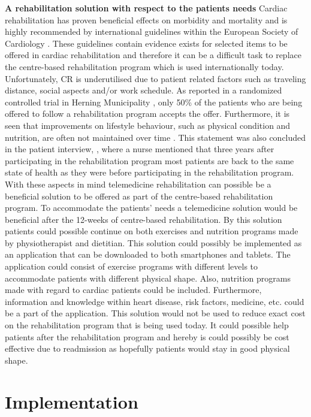 \textbf{A rehabilitation solution with respect to the patients needs} \newline
Cardiac rehabilitation has proven beneficial effects on morbidity and mortality and is highly recommended by international guidelines within the European Society of Cardiology \cite{ESC}. These guidelines contain evidence exists for selected items to be offered in cardiac rehabilitation and therefore it can be a difficult task to replace the centre-based rehabilitation program which is used internationally today. Unfortunately, CR is underutilised due to patient related factors such as traveling distance, social aspects and/or work schedule. As reported in a randomized controlled trial in Herning Municipality \cite{rehab}, only 50\% of the patients who are being offered to follow a rehabilitation program accepts the offer. Furthermore, it is seen that improvements on lifestyle behaviour, such as physical condition and nutrition, are often not maintained over time \cite{CAD}. This statement was also concluded in the patient interview, , where a nurse mentioned that three years after participating in the rehabilitation program most patients are back to the same state of health as they were before participating in the rehabilitation program. With these aspects in mind telemedicine rehabilitation can possible be a beneficial solution to be offered as part of the centre-based rehabilitation program. To accommodate the patients’ needs a telemedicine solution would be beneficial after the 12-weeks of centre-based rehabilitation. By this solution patients could possible continue on both exercises and nutrition programs made by physiotherapist and dietitian. This solution could possibly be implemented as an application that can be downloaded to both smartphones and tablets. The application could consist of exercise programs with different levels to accommodate patients with different physical shape. Also, nutrition programs made with regard to cardiac patients could be included. Furthermore, information and knowledge within heart disease, risk factors, medicine, etc. could be a part of the application. This solution would not be used to reduce exact cost on the rehabilitation program that is being used today. It could possible help patients after the rehabilitation program and hereby is could possibly be cost effective due to readmission as hopefully patients would stay in good physical shape. 


\section{Implementation}

